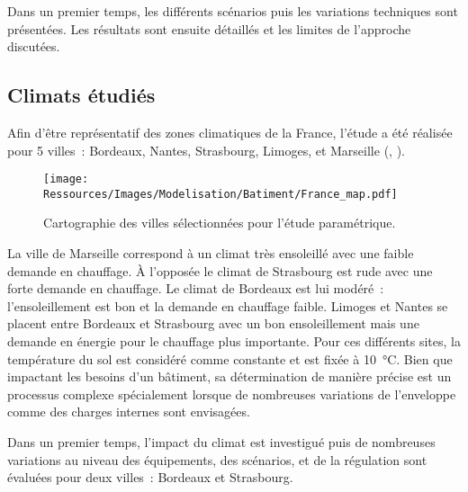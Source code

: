 Dans un premier temps, les différents scénarios puis les variations techniques
sont présentées. Les résultats sont ensuite détaillés et les limites
de l’approche discutées.


\subsection{Climats étudiés} %
\label{sub:climats_etudies}
Afin d’être représentatif des zones climatiques de la France, l’étude a été réalisée
pour 5 villes~: Bordeaux, Nantes, Strasbourg, Limoges, et Marseille (,
).
\begin{figure}
    \centering
    \texttt{[image: Ressources/Images/Modelisation/Batiment/France\_map.pdf]}
    \caption{Cartographie des villes sélectionnées pour l’étude paramétrique.}
    \label{fig:carte_france}
\end{figure}
La ville de Marseille correspond à un climat très ensoleillé avec une faible demande en
chauffage. À l’opposée le climat de Strasbourg est rude avec
une forte demande en chauffage. Le climat de Bordeaux est lui modéré~: l’ensoleillement est bon
et la demande en chauffage faible. Limoges et Nantes se placent entre Bordeaux et
Strasbourg avec un bon ensoleillement mais une demande en énergie pour le chauffage plus
importante. Pour ces différents sites, la température du sol est
considéré comme constante et est fixée à \SI{10}{\celsius}. Bien que impactant les besoins
d’un bâtiment, sa détermination de manière précise est un processus complexe spécialement
lorsque de nombreuses variations de l’enveloppe comme des charges internes sont envisagées.

Dans un premier temps, l’impact du climat est investigué puis de nombreuses variations au
niveau des équipements, des scénarios, et de la régulation sont évaluées pour deux
villes~: Bordeaux et Strasbourg.

